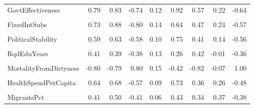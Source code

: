 \documentclass[
]{article}
\begin{document}
\begin{table}
{\begin{tabular}[t]{lrrrrrrrr}
GovtEffectiveness & 0.79 & 0.83 & -0.74 & 0.12 & 0.92 & 0.57 & 0.22 & -0.64\\
\cellcolor{gray!10}{ShippingIndex} & \cellcolor{gray!10}{0.46} & \cellcolor{gray!10}{0.46} & \cellcolor{gray!10}{-0.38} & \cellcolor{gray!10}{0.10} & \cellcolor{gray!10}{0.35} & \cellcolor{gray!10}{0.34} & \cellcolor{gray!10}{0.34} & \cellcolor{gray!10}{-0.36}\\
FixedIntSubs & 0.73 & 0.88 & -0.80 & 0.14 & 0.64 & 0.47 & 0.24 & -0.57\\
\cellcolor{gray!10}{InternetUsersPct} & \cellcolor{gray!10}{0.72} & \cellcolor{gray!10}{0.87} & \cellcolor{gray!10}{-0.82} & \cellcolor{gray!10}{0.29} & \cellcolor{gray!10}{0.56} & \cellcolor{gray!10}{0.55} & \cellcolor{gray!10}{0.15} & \cellcolor{gray!10}{-0.64}\\
\addlinespace
PoliticalStability & 0.59 & 0.63 & -0.58 & 0.10 & 0.75 & 0.41 & 0.14 & -0.56\\
\cellcolor{gray!10}{RuleOfLaw} & \cellcolor{gray!10}{0.74} & \cellcolor{gray!10}{0.77} & \cellcolor{gray!10}{-0.68} & \cellcolor{gray!10}{0.13} & \cellcolor{gray!10}{0.94} & \cellcolor{gray!10}{0.50} & \cellcolor{gray!10}{0.18} & \cellcolor{gray!10}{-0.63}\\
RqdEduYears & 0.41 & 0.39 & -0.38 & 0.13 & 0.26 & 0.42 & -0.01 & -0.36\\
\cellcolor{gray!10}{GovtEduSpendPctGDP} & \cellcolor{gray!10}{0.26} & \cellcolor{gray!10}{0.28} & \cellcolor{gray!10}{-0.28} & \cellcolor{gray!10}{0.11} & \cellcolor{gray!10}{0.35} & \cellcolor{gray!10}{0.20} & \cellcolor{gray!10}{-0.15} & \cellcolor{gray!10}{-0.33}\\
MortalityFromDirtyness & -0.80 & -0.79 & 0.80 & 0.15 & -0.42 & -0.82 & -0.07 & 1.00\\
\addlinespace
\cellcolor{gray!10}{UHCServiceCoverage} & \cellcolor{gray!10}{0.92} & \cellcolor{gray!10}{0.92} & \cellcolor{gray!10}{-0.86} & \cellcolor{gray!10}{0.25} & \cellcolor{gray!10}{0.61} & \cellcolor{gray!10}{0.81} & \cellcolor{gray!10}{0.13} & \cellcolor{gray!10}{-0.79}\\
HealthSpendPerCapita & 0.64 & 0.68 & -0.57 & 0.09 & 0.73 & 0.36 & 0.26 & -0.48\\
\cellcolor{gray!10}{GovtHealthSpendPerCapita} & \cellcolor{gray!10}{0.63} & \cellcolor{gray!10}{0.67} & \cellcolor{gray!10}{-0.57} & \cellcolor{gray!10}{0.09} & \cellcolor{gray!10}{0.72} & \cellcolor{gray!10}{0.35} & \cellcolor{gray!10}{0.29} & \cellcolor{gray!10}{-0.47}\\
MigrantsPct & 0.41 & 0.50 & -0.41 & 0.06 & 0.43 & 0.34 & 0.37 & -0.38\\

\end{tabular}}
\end{table}
\end{document}
